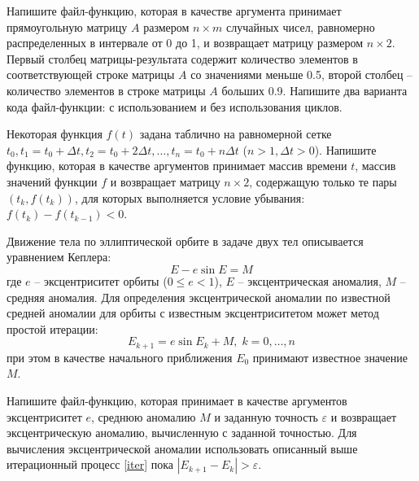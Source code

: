 \documentclass[addpoints,12pt]{exam}
\begin{document}
\vspace{0.1in}
\vspace{0.1in}

\begin{questions}

\question[3]
Напишите файл-функцию, которая в качестве аргумента принимает прямоугольную матрицу $A$ размером $n \times m$ случайных чисел, равномерно распределенных в интервале от 0 до 1, и возвращает матрицу размером $n \times 2$. Первый столбец матрицы-результата содержит количество элементов в соответствующей строке матрицы $A$ со значениями меньше 0.5, второй столбец -- количество элементов в строке матрицы $A$ больших 0.9. Напишите два варианта кода файл-функции: с использованием и без использования циклов.
\makeemptybox{7.8cm}


\question[3] 
Некоторая функция $f(t)$ задана таблично на равномерной сетке $t_0, t_1 = t_0+\Delta t, t_2 = t_0+2\Delta t,\ldots,t_n = t_0+n\Delta t$ ($n>1, \Delta t>0$). Напишите функцию, которая в качестве аргументов принимает массив времени $t$, массив значений функции $f$ и возвращает матрицу $n \times 2$, содержащую только те пары  $(t_k, f(t_k))$, для которых выполняется условие убывания: $ f(t_k)-f(t_{k-1})<0 $.

\makeemptybox{9cm}

\question[3] Движение тела по эллиптической орбите в задаче двух тел описывается уравнением Кеплера:
$$
E - e \sin E = M
$$
где $e$ -- эксцентриситет орбиты ($0 \leq e < 1$), $E$ -- эксцентрическая аномалия, $M$ -- средняя аномалия.
Для определения эксцентрической аномалии по известной средней аномалии для орбиты с известным эксцентриситетом может метод простой итерации:
\begin{equation}\label{iter}
    E_{k+1} = e \sin E_k + M, \; k=0,\ldots,n 
\end{equation}
при этом в качестве начального приближения $E_0$ принимают известное значение $M$. 

Напишите файл-функцию, которая принимает в качестве аргументов эксцентриситет $e$, среднюю аномалию $M$ и заданную точность $\varepsilon$ и возвращает эксцентрическую аномалию, вычисленную с заданной точностью. Для вычисления эксцентрической аномалии использовать описанный выше итерационный процесс \eqref{iter} пока $|E_{k+1}-E_{k}|>\varepsilon$.
\makeemptybox{6cm}
\end{questions}


\vfill

\begin{center}
\gradetable[h][questions]
\end{center}
\end{document}
